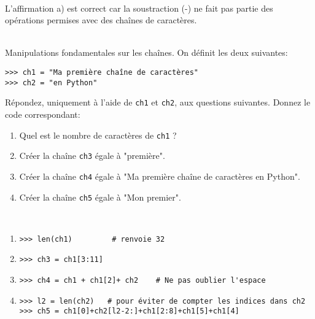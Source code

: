 \documentclass[a4paper,12pt]{article}
\newcommand{\numero}{1}                                    %
\begin{document}
\begin{correction}
	~\\ 
	L'affirmation a) est correct car la soustraction (-) ne fait pas partie des opérations permises avec des chaînes de caractères.
\end{correction}
\finexo
\exo{}  ~\\ 
Manipulations fondamentales sur les chaînes. On définit les deux suivantes:
\begin{lstlisting}[numbers=none]
>>> ch1 = "Ma première chaîne de caractères"
>>> ch2 = "en Python"
\end{lstlisting}
Répondez, uniquement à l'aide de \lstinline{ch1} et \lstinline{ch2}, aux questions suivantes. Donnez le code \py correspondant:
	\begin{enumerate}[label*=\arabic*] 
		\item Quel est le nombre de caractères de \lstinline{ch1} ?
		\item Créer la chaîne \lstinline{ch3} égale à "première".
		\item Créer la chaîne \lstinline{ch4} égale à "Ma première chaîne de caractères en Python".
		\item Créer la chaîne \lstinline{ch5} égale à "Mon premier".
	\end{enumerate}

\begin{correction}
	~\\ 
	\begin{enumerate}[label*=\arabic*] 
		\item \lstinline{>>> len(ch1)         # renvoie 32}
		\item \lstinline{>>> ch3 = ch1[3:11]}
		\item \lstinline{>>> ch4 = ch1 + ch1[2]+ ch2    # Ne pas oublier l'espace}
		\item 
		     \lstinline{>>> l2 = len(ch2)   # pour éviter de compter les indices dans ch2}\newline
		     \lstinline{>>> ch5 = ch1[0]+ch2[l2-2:]+ch1[2:8]+ch1[5]+ch1[4]}
	\end{enumerate}
\end{correction}
\finexo

		\newpage
		\setcounter{page}{1}
		\setcounter{section}{\numero}
		

		\section{}
	
\end{document}
